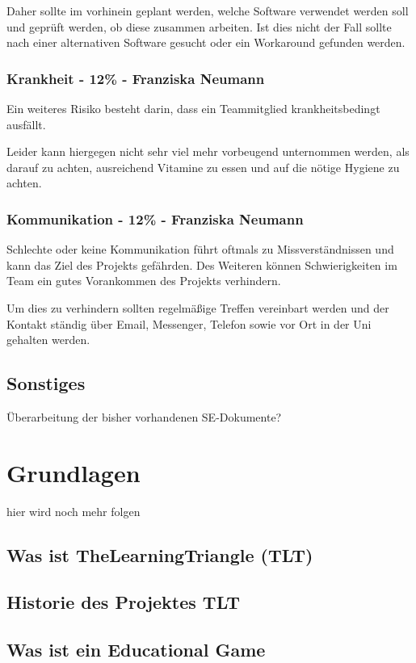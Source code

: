 Daher sollte im vorhinein geplant werden, welche Software verwendet werden soll und geprüft werden, ob diese zusammen arbeiten. Ist dies nicht der Fall sollte nach einer alternativen Software gesucht oder ein Workaround gefunden werden.

\subsubsection{Krankheit - 12\% - Franziska Neumann}
Ein weiteres Risiko besteht darin, dass ein Teammitglied krankheitsbedingt ausfällt. 

Leider kann hiergegen nicht sehr viel mehr vorbeugend unternommen werden, als darauf zu achten, ausreichend Vitamine zu essen und auf die nötige Hygiene zu achten.

\subsubsection{Kommunikation - 12\% - Franziska Neumann}
Schlechte oder keine Kommunikation führt oftmals zu Missverständnissen und kann das Ziel des Projekts gefährden. Des Weiteren können Schwierigkeiten im Team ein gutes Vorankommen des Projekts verhindern.

Um dies zu verhindern sollten regelmäßige Treffen vereinbart werden und der Kontakt ständig über Email, Messenger, Telefon sowie vor Ort in der Uni gehalten werden.

\subsection{Sonstiges}

Überarbeitung der bisher vorhandenen SE-Dokumente?

\section{Grundlagen}

hier wird noch mehr folgen

\subsection{Was ist TheLearningTriangle (TLT)}

\subsection{Historie des Projektes TLT}

\subsection{Was ist ein Educational Game}


